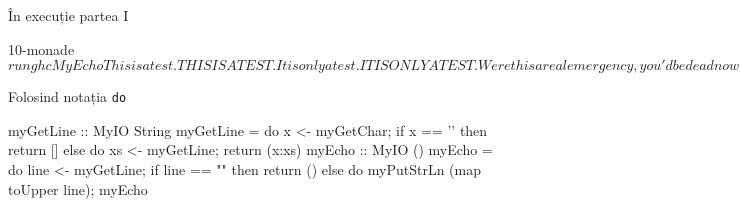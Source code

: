 \documentclass[xcolor=pdftex,romanian,colorlinks]{beamer}
\begin{document}

\begin{frame}[fragile]{În execuție}
{partea I}
\begin{asciihs}
  10-monade$ runghc MyEcho
  This is a test.
  THIS IS A TEST.
  It is only a test.
  IT IS ONLY A TEST.
  Were this a real emergency, you'd be dead now.
  WERE THIS A REAL EMERGENCY, YOU'D BE DEAD NOW.

  10-monade$
\end{asciihs}
\end{frame}

\begin{frame}[fragile]{Folosind notația \lstinline$do$}
\vspace{-2ex}
\begin{asciihs}
  myGetLine :: MyIO String
  myGetLine = do {
                 x <- myGetChar;
                 if x == '\n' then
                   return []
                 else do {
                   xs <- myGetLine;
                   return (x:xs)
                 }
               }
  myEcho :: MyIO ()
  myEcho = do {
              line <- myGetLine;
              if line == "" then
                return ()
              else do {
                myPutStrLn (map toUpper line);
                myEcho
              } }
\end{asciihs}
\end{frame}


%
\end{document}
